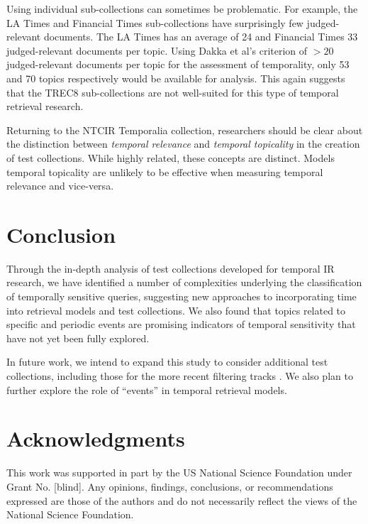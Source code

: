 \documentclass{sig-alternate}
\begin{document}
Using individual sub-collections can sometimes be problematic. For example,  the LA Times and Financial Times sub-collections have surprisingly few judged-relevant documents. The LA Times has an average of 24 and Financial Times 33 judged-relevant documents per topic.  Using Dakka et al's \cite{Dakka2012} criterion of $>20$ judged-relevant documents per topic for the assessment of temporality, only 53 and 70 topics respectively would be available for analysis. This again suggests that the TREC8 sub-collections are not well-suited for this type of temporal retrieval research.

Returning to the NTCIR Temporalia collection, researchers should be clear about the distinction between \emph{temporal relevance} and \emph{temporal topicality} in the creation of test collections. While highly related, these concepts are distinct. Models temporal topicality are unlikely to be effective when measuring temporal relevance and vice-versa.

\section{Conclusion}

Through the in-depth analysis of test collections developed for temporal IR research, we have identified a number of complexities underlying the classification of temporally sensitive queries, suggesting new approaches to incorporating time into retrieval models and test collections. We also found that topics related to specific and periodic events are promising indicators of temporal sensitivity that have not yet been fully explored.  

In future work, we intend to expand this study to consider additional test collections, including those for the more recent filtering tracks \cite{Frank2013, Guo2013}. We also plan to further explore the role of ``events'' in temporal retrieval models.

\section{Acknowledgments}
This work was supported in part by the US National Science Foundation under Grant No. [blind]. Any opinions, findings, conclusions, or recommendations expressed are those of the authors and do not necessarily reflect the views of the National Science Foundation. 


  
\end{document}
